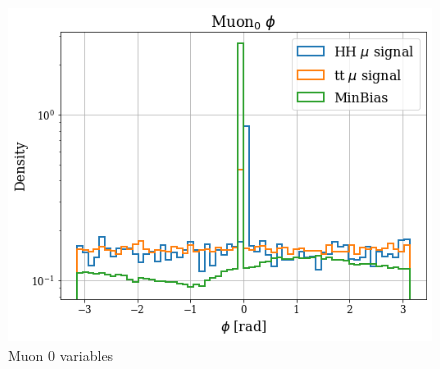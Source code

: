 \documentclass[../main.tex]{subfiles}
\begin{document}
\begin{figure}[h]
\begin{minipage}[b]{0.33\linewidth}
    \centering
    \includegraphics[width=1\linewidth]{Chapters/Plots/Hist_1mu_muon0_Phi.png}
  \end{minipage}
  \caption{Muon 0 variables}
\end{figure}
\end{document}
